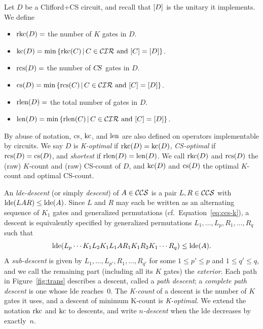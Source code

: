 \documentclass[reprint,amsmath,amssymb,aps,pra]{revtex4-2}
\begin{document}
\begin{definition}
  \label{def:count}
  Let $D$ be a Clifford+CS circuit, and recall that $[D]$ is the
  unitary it implements. We define
  \begin{itemize}
  \item $\operatorname{rkc}(D)=$ the number of $K$ gates in $D$.
  \item
    $\operatorname{kc}(D)= \min \left\{\operatorname{rkc}(C)\,|\,C \in {\mathcal{CIR}} \text{ and } [C] =
      [D]\right\}$.
  \item $\operatorname{rcs}(D)=$ the number of $C\kern-.16667em S$ gates in $D$.
  \item
    $\operatorname{cs}(D)= \min \left\{\operatorname{rcs}(C)\,|\,C \in {\mathcal{CIR}} \text{ and } [C] =
      [D]\right\}$.
  \item $\operatorname{rlen}(D)=$ the total number of gates in $D$.
  \item
    $\operatorname{len}(D)= \min \left\{\operatorname{rlen}(C)\,|\,C \in {\mathcal{CIR}} \text{ and } [C] =
      [D]\right\}$.
  \end{itemize}
  By abuse of notation, $\operatorname{cs}$, $\operatorname{kc}$, and $\operatorname{len}$ are also defined on
  operators implementable by circuits. We say $D$ is \emph{K-optimal}
  if $\operatorname{rkc}(D) = \operatorname{kc}(D)$, \emph{CS-optimal} if $\operatorname{rcs}(D) = \operatorname{cs}(D)$, and
  \emph{shortest} if $\operatorname{rlen}(D) = \operatorname{len}(D)$. We call $\operatorname{rkc}(D)$ and
  $\operatorname{rcs}(D)$ the (raw) $K$-count and (raw) CS-count of $D$, and
  $\operatorname{kc}(D)$ and $\operatorname{cs}(D)$ the optimal $K$-count and optimal CS-count.
\end{definition}


\begin{definition}
  An \emph{lde-descent} (or simply \emph{descent}) of
  $A\in{\mathcal{CCS}}$ is a pair $L,R \in {\mathcal{CCS}}$ with
  $\operatorname{lde}(LAR) \le \operatorname{lde}(A)$. Since $L$ and $R$ may each be written as
  an alternating sequence of $K_1$ gates and generalized permutations
  (cf.\ Equation~\eqref{eq:ccs-k}), a descent is equivalently
  specified by generalized permutations
  $L_1,\ldots,L_p,R_1,\ldots,R_q$ such that
  \[
    \operatorname{lde}(L_p\cdots K_1L_2K_1L_1AR_1K_1R_2K_1\cdots R_q) \le \operatorname{lde}(A).
  \]
  A \emph{sub-descent} is given by
  $L_1,\ldots,L_{p'},R_1,\ldots,R_{q'}$ for some
  $1\le p' \le p$ and $1\le q' \le q$, and we call the remaining
  part (including all its $K$ gates) the \emph{exterior}. Each path in
  Figure~\ref{fig:trans} describes a descent, called a \emph{path
    descent}; a \emph{complete path descent} is one whose lde
  reaches~$0$. The \emph{K-count} of a descent is the number of $K$
  gates it uses, and a descent of minimum K-count is
  \emph{K-optimal}. We extend the notation $\operatorname{rkc}$ and $\operatorname{kc}$ to
  descents, and write \emph{$n$-descent} when the lde decreases by
  exactly~$n$.
\end{definition}
\end{document}
